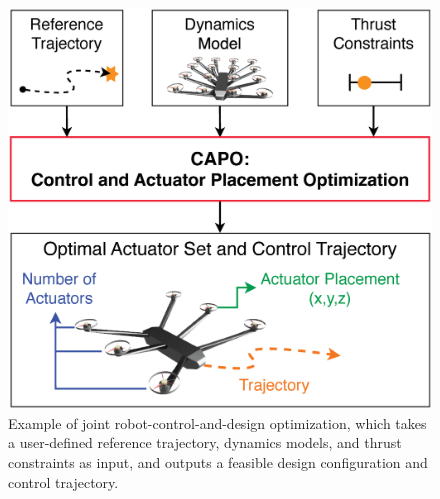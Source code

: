 \documentclass[runningheads]{llncs}
\begin{document}
\begin{figure}
    \vspace{-10pt}

    \centering
    \includegraphics[width=0.6\linewidth]{figures/Figure_1_CAPO_motivation.eps}
    \caption{Example of joint robot-control-and-design optimization, which takes a user-defined reference trajectory, dynamics models, and thrust constraints as input, and outputs a feasible design configuration and control trajectory. %
    }
    \label{fig:simple_example}
    \vspace{-15pt}

\end{figure}
\end{document}
